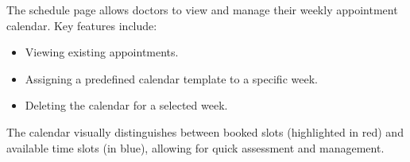 The schedule page allows doctors to view and manage their weekly appointment calendar. Key features include:
\begin{itemize}
    \item Viewing existing appointments.
    \item Assigning a predefined calendar template to a specific week.
    \item Deleting the calendar for a selected week.
\end{itemize}

The calendar visually distinguishes between booked slots (highlighted in red) and available time slots (in blue), allowing for quick assessment and management.
